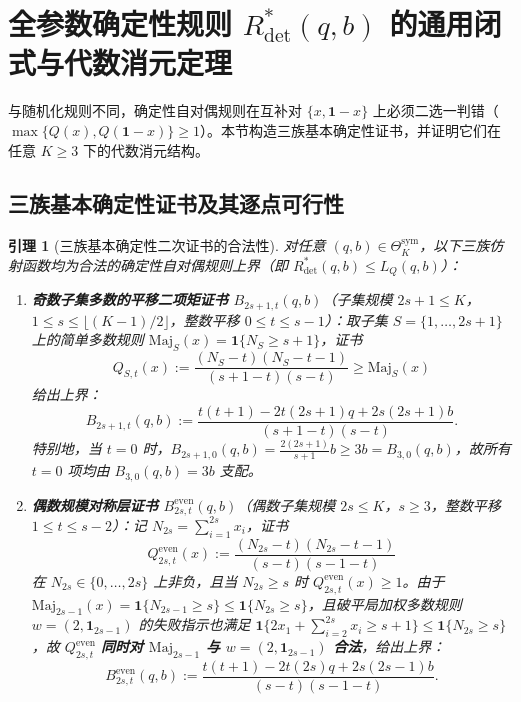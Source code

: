 \documentclass[11pt,a4paper]{article}
\newtheorem{lemma}[theorem]{引理}
\theoremstyle{definition}
\theoremstyle{remark}
\newcommand{\Rdet}{R^*_{\mathrm{det}}}
\newcommand{\Thetasym}{\Theta^{\mathrm{sym}}_K}
\begin{document}
\section{全参数确定性规则 $\Rdet(q,b)$ 的通用闭式与代数消元定理}

与随机化规则不同，确定性自对偶规则在互补对 $\{x, \mathbf{1}-x\}$ 上必须二选一判错（$\max\{Q(x), Q(\mathbf{1}-x)\} \ge 1$）。本节构造三族基本确定性证书，并证明它们在任意 $K \ge 3$ 下的代数消元结构。

\subsection{三族基本确定性证书及其逐点可行性}

\begin{lemma}[三族基本确定性二次证书的合法性]\label{lem:three_families}
对任意 $(q, b) \in \Thetasym$，以下三族仿射函数均为合法的确定性自对偶规则上界（即 $\Rdet(q, b) \le L_Q(q, b)$）：
\begin{enumerate}
  \setlength{\itemsep}{3pt}\setlength{\parskip}{0pt}
  \item \textbf{奇数子集多数的平移二项矩证书 $B_{2s+1, t}(q, b)$}（子集规模 $2s+1 \le K$，$1 \le s \le \lfloor (K-1)/2 \rfloor$，整数平移 $0 \le t \le s - 1$）：取子集 $S = \{1, \dots, 2s+1\}$ 上的简单多数规则 $\mathrm{Maj}_S(x) = \mathbf{1}\{N_S \ge s+1\}$，证书
  \[
    Q_{S, t}(x) := \frac{(N_S - t)(N_S - t - 1)}{(s + 1 - t)(s - t)} \ge \mathrm{Maj}_S(x)
  \]
  给出上界：
  \begin{equation}\label{eq:B_odd}
    B_{2s+1, t}(q, b) := \frac{t(t+1) - 2t(2s+1)q + 2s(2s+1)b}{(s + 1 - t)(s - t)}.
  \end{equation}
  特别地，当 $t = 0$ 时，$B_{2s+1, 0}(q, b) = \frac{2(2s+1)}{s+1}b \ge 3b = B_{3, 0}(q, b)$，故所有 $t=0$ 项均由 $B_{3,0}(q,b) = 3b$ 支配。

  \item \textbf{偶数规模对称层证书 $B^{\mathrm{even}}_{2s, t}(q, b)$}（偶数子集规模 $2s \le K$，$s \ge 3$，整数平移 $1 \le t \le s - 2$）：记 $N_{2s} = \sum_{i=1}^{2s} x_i$，证书
  \[
    Q^{\mathrm{even}}_{2s, t}(x) := \frac{(N_{2s} - t)(N_{2s} - t - 1)}{(s - t)(s - 1 - t)}
  \]
  在 $N_{2s} \in \{0, \dots, 2s\}$ 上非负，且当 $N_{2s} \ge s$ 时 $Q^{\mathrm{even}}_{2s, t}(x) \ge 1$。由于 $\mathrm{Maj}_{2s-1}(x) = \mathbf{1}\{N_{2s-1} \ge s\} \le \mathbf{1}\{N_{2s} \ge s\}$，且破平局加权多数规则 $w = (2, \mathbf{1}_{2s-1})$ 的失败指示也满足 $\mathbf{1}\{2x_1 + \sum_{i=2}^{2s} x_i \ge s+1\} \le \mathbf{1}\{N_{2s} \ge s\}$，故 $Q^{\mathrm{even}}_{2s, t}$ \textbf{同时对 $\mathrm{Maj}_{2s-1}$ 与 $w = (2, \mathbf{1}_{2s-1})$ 合法}，给出上界：
  \begin{equation}\label{eq:B_even}
    B^{\mathrm{even}}_{2s, t}(q, b) := \frac{t(t+1) - 2t(2s)q + 2s(2s-1)b}{(s - t)(s - 1 - t)}.
  \end{equation}


\end{enumerate}
\end{lemma}
\end{document}
